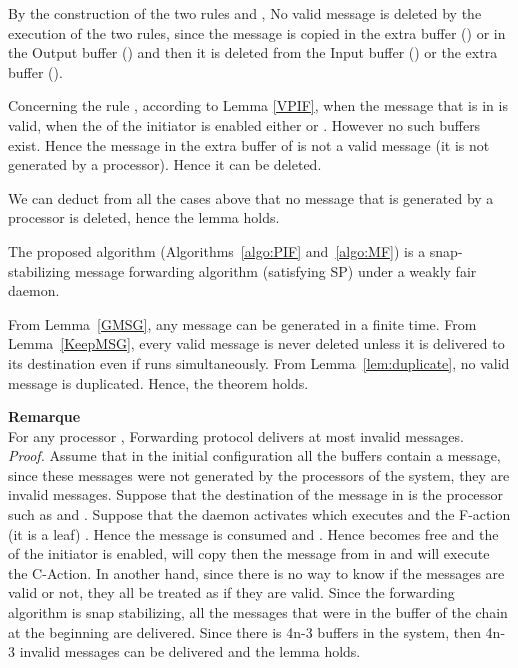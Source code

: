 \documentclass{llncs}
\renewenvironment{proof}{{\it Proof. } }{{\hfill }\vspace{.5pc}}
\begin{document}
\begin{proof}
By the construction of the two rules  and , No valid message is deleted by the execution of the two rules, since the message is copied in the extra buffer () or in the Output buffer () and then it is deleted from the Input buffer () or the extra buffer ().

Concerning the rule , according to Lemma \ref{VPIF}, when the message that is in  is valid, when the  of the initiator is enabled either  or . However no such buffers exist. Hence the message in the extra buffer of  is not a valid message (it is not generated by a processor). Hence it can be deleted.

We can deduct from all the cases above that no message that is generated by a processor is deleted, hence the lemma holds.  

\end{proof}



\begin{theorem}
The proposed algorithm (Algorithms~\ref{algo:PIF} and~\ref{algo:MF}) is a snap-stabilizing message forwarding
algorithm (satisfying SP) under a weakly fair daemon. 
\end{theorem}

\begin{proof}
From Lemma~\ref{GMSG}, any message can be generated in a finite time.  
From Lemma~\ref{KeepMSG}, every valid message is never deleted unless it is delivered to its destination even if  runs simultaneously.
From Lemma~\ref{lem:duplicate}, no valid message is duplicated. 
Hence, the theorem holds.
\end{proof}



\textbf{Remarque}\\For any processor , Forwarding protocol delivers at most  invalid messages.\\


\begin{proof}
Assume that in the initial configuration all the buffers contain a message, since these messages were not generated by the processors of the system, they are invalid messages. Suppose that the destination of the message  in  is the processor  such as  and . Suppose that the daemon activates  which executes  and the F-action (it is a leaf) . Hence the message  is consumed and . Hence  becomes free and the  of the initiator is enabled,  will copy then the message from  in  and will execute the C-Action. In another hand, since there is no way to know if the messages are valid or not, they all be treated as if they are valid. Since the forwarding algorithm is snap stabilizing, all the messages that were in the buffer of the chain at the beginning are delivered. Since there is 4n-3 buffers in the system, then 4n-3 invalid messages can be delivered and the lemma holds. \\
\end{proof}
\end{document}
